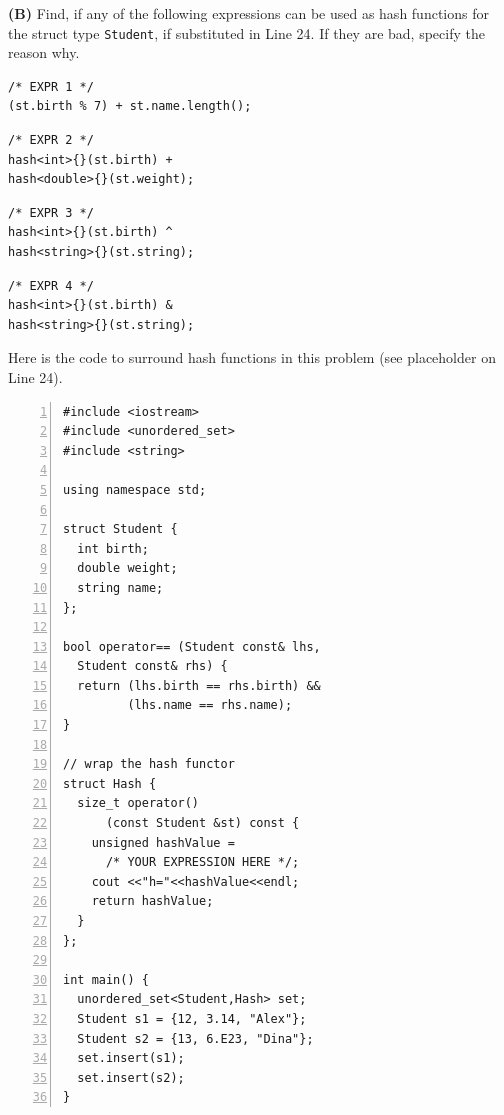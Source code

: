 \documentclass[a4paper,12pt]{article}
\begin{document}
\vspace{5pt}
{\bf (B)} Find, if any of the following expressions 
can be used as hash functions for the struct type {\tt Student}, 
if substituted in Line 24. If they are bad, 
specify the reason why.

\vspace{5pt}
\begin{Verbatim}[frame=single]
/* EXPR 1 */
(st.birth % 7) + st.name.length();
\end{Verbatim}

\vspace{5pt}
\begin{Verbatim}[frame=single]
/* EXPR 2 */
hash<int>{}(st.birth) + 
hash<double>{}(st.weight);
\end{Verbatim}

\begin{Verbatim}[frame=single]
/* EXPR 3 */
hash<int>{}(st.birth) ^ 
hash<string>{}(st.string);
\end{Verbatim}

\begin{Verbatim}[frame=single]
/* EXPR 4 */
hash<int>{}(st.birth) & 
hash<string>{}(st.string);
\end{Verbatim}



\vspace{10pt}
Here is the code to surround hash functions in 
this problem (see placeholder on Line 24). 

\vspace{5pt}
\begin{Verbatim}[frame=single,numbers=left]
#include <iostream>
#include <unordered_set>
#include <string>

using namespace std;

struct Student {
  int birth;
  double weight;
  string name;  
}; 

bool operator== (Student const& lhs, 
  Student const& rhs) {
  return (lhs.birth == rhs.birth) && 
         (lhs.name == rhs.name); 
}

// wrap the hash functor
struct Hash {
  size_t operator() 
      (const Student &st) const {       
    unsigned hashValue = 
      /* YOUR EXPRESSION HERE */;
    cout <<"h="<<hashValue<<endl;
    return hashValue;
  }
};

int main() {
  unordered_set<Student,Hash> set;
  Student s1 = {12, 3.14, "Alex"};
  Student s2 = {13, 6.E23, "Dina"};
  set.insert(s1);
  set.insert(s2);
}
\end{Verbatim}
\end{document}
